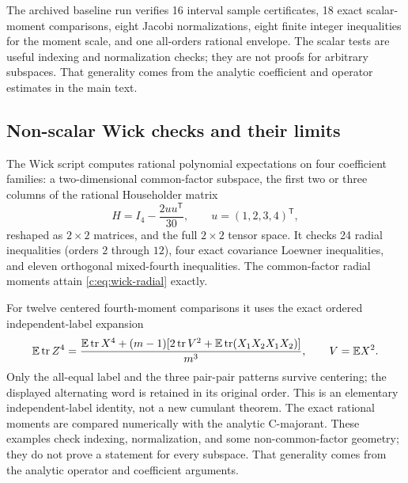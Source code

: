 \documentclass[11pt]{article}
\numberwithin{equation}{section}
\theoremstyle{definition}\newtheorem{definition}[theorem]{Definition}
\theoremstyle{remark}\newtheorem{remark}[theorem]{Remark}
\newcommand{\tr}{\operatorname{tr}}\newcommand{\Ent}{\operatorname{Ent}}
\begin{document}
The archived baseline run verifies 16 interval sample certificates, 18 exact
scalar-moment comparisons, eight Jacobi normalizations, eight finite integer
inequalities for the moment scale, and one all-orders rational envelope.
The scalar tests are useful indexing and normalization checks; they are not
proofs for arbitrary subspaces. That generality comes from the analytic
coefficient and operator estimates in the main text.

\subsection{Non-scalar Wick checks and their limits}
The Wick script computes rational polynomial expectations on four coefficient
families: a two-dimensional common-factor subspace, the first two or three
columns of the rational Householder matrix
\[
 H=I_4-\frac{2uu^{\mathsf T}}{30},\qquad u=(1,2,3,4)^{\mathsf T},
\]
reshaped as $2\times2$ matrices, and the full $2\times2$ tensor space.
It checks 24 radial inequalities (orders $2$ through $12$), four exact
covariance Loewner inequalities, and eleven orthogonal mixed-fourth inequalities.
The common-factor radial moments attain \eqref{c:eq:wick-radial} exactly.

For twelve centered fourth-moment comparisons it uses the exact ordered
independent-label expansion
\[
 \E\tr Z^4=
 \frac{\E\tr X^4+(m-1)[2\tr V^2+\E\tr(X_1X_2X_1X_2)]}{m^3},
 \qquad V=\E X^2.
\]
Only the all-equal label and the three pair-pair patterns survive centering;
the displayed alternating word is retained in its original order. This is an
elementary independent-label identity, not a new cumulant theorem. The exact
rational moments are compared numerically with the analytic C-majorant.
These examples check indexing, normalization, and some non-common-factor
geometry; they do not prove a statement for every subspace. That generality
comes from the analytic operator and coefficient arguments.
\end{document}
